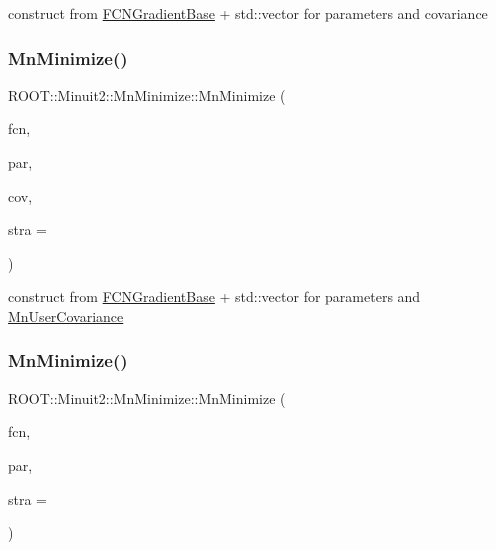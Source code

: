 construct from \mbox{\hyperlink{classROOT_1_1Minuit2_1_1FCNGradientBase}{F\+C\+N\+Gradient\+Base}} + std\+::vector for parameters and covariance 

\mbox{\label{classROOT_1_1Minuit2_1_1MnMinimize_a4f00e31f1d1bd5bd1e8771d9434eb3f7}} 
\subsubsection{\texorpdfstring{MnMinimize()}{MnMinimize()}\hspace{0.1cm}{\footnotesize\ttfamily [22/26]}}
{\footnotesize\ttfamily R\+O\+O\+T\+::\+Minuit2\+::\+Mn\+Minimize\+::\+Mn\+Minimize (\begin{DoxyParamCaption}\item[{const \mbox{\hyperlink{classROOT_1_1Minuit2_1_1FCNGradientBase}{F\+C\+N\+Gradient\+Base}} \&}]{fcn,  }\item[{const std\+::vector$<$ double $>$ \&}]{par,  }\item[{const \mbox{\hyperlink{classROOT_1_1Minuit2_1_1MnUserCovariance}{Mn\+User\+Covariance}} \&}]{cov,  }\item[{unsigned int}]{stra = {} }\end{DoxyParamCaption})\hspace{0.3cm}{\ttfamily [inline]}}



construct from \mbox{\hyperlink{classROOT_1_1Minuit2_1_1FCNGradientBase}{F\+C\+N\+Gradient\+Base}} + std\+::vector for parameters and \mbox{\hyperlink{classROOT_1_1Minuit2_1_1MnUserCovariance}{Mn\+User\+Covariance}} 

\mbox{\label{classROOT_1_1Minuit2_1_1MnMinimize_a7ae2da481677eb3b7fcf3b77a8dee92b}} 
\subsubsection{\texorpdfstring{MnMinimize()}{MnMinimize()}\hspace{0.1cm}{\footnotesize\ttfamily [23/26]}}
{\footnotesize\ttfamily R\+O\+O\+T\+::\+Minuit2\+::\+Mn\+Minimize\+::\+Mn\+Minimize (\begin{DoxyParamCaption}\item[{const \mbox{\hyperlink{classROOT_1_1Minuit2_1_1FCNGradientBase}{F\+C\+N\+Gradient\+Base}} \&}]{fcn,  }\item[{const \mbox{\hyperlink{classROOT_1_1Minuit2_1_1MnUserParameters}{Mn\+User\+Parameters}} \&}]{par,  }\item[{unsigned int}]{stra = {} }\end{DoxyParamCaption})\hspace{0.3cm}{\ttfamily [inline]}}



